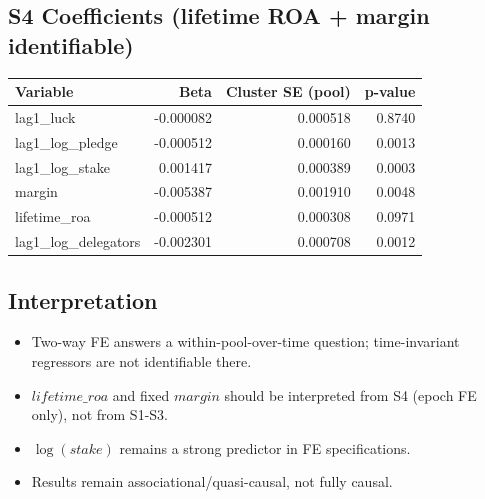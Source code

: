 \documentclass[11pt]{article}
\begin{document}
\subsection*{S4 Coefficients (lifetime ROA + margin identifiable)}
\begin{longtable}{l r r r}
\toprule
Variable & Beta & Cluster SE (pool) & p-value \\
\midrule
\endhead
lag1\_luck & -0.000082 & 0.000518 & 0.8740 \\
lag1\_log\_pledge & -0.000512 & 0.000160 & 0.0013 \\
lag1\_log\_stake & 0.001417 & 0.000389 & 0.0003 \\
margin & -0.005387 & 0.001910 & 0.0048 \\
lifetime\_roa & -0.000512 & 0.000308 & 0.0971 \\
lag1\_log\_delegators & -0.002301 & 0.000708 & 0.0012 \\
\bottomrule
\end{longtable}
\subsection*{Interpretation}
\begin{itemize}
\item Two-way FE answers a within-pool-over-time question; time-invariant regressors are not identifiable there.
\item $lifetime\_roa$ and fixed $margin$ should be interpreted from S4 (epoch FE only), not from S1-S3.
\item $\log(stake)$ remains a strong predictor in FE specifications.
\item Results remain associational/quasi-causal, not fully causal.
\end{itemize}
\end{document}
